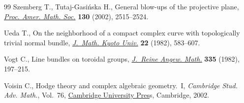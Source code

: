 \documentclass[pdftex]{sigma}
\numberwithin{equation}{section}
\begin{document}
\begin{thebibliography}{99}
Szemberg T., Tutaj-Gasi\'nska H., General blow-ups of the projective plane,
 \href{https://doi.org/10.1090/S0002-9939-02-06488-2}{\textit{Proc. Amer.
 Math. Soc.}} \textbf{130} (2002), 2515--2524.

Ueda T., On the neighborhood of a compact complex curve with topologically
 trivial normal bundle,
 \href{https://doi.org/10.1215/kjm/1250521670}{\textit{J.~Math. Kyoto Univ.}}
 \textbf{22} (1982), 583--607.

Vogt C., Line bundles on toroidal groups,
 \href{https://doi.org/10.1515/crll.1982.335.197}{\textit{J.~Reine Angew.
 Math.}} \textbf{335} (1982), 197--215.

Voisin C., Hodge theory and complex algebraic geometry.~{I}, \textit{Cambridge
 Stud. Adv. Math.}, Vol.~76,
 \href{https://doi.org/10.1017/CBO9780511615344}{Cambridge University Pres}s,
 Cambridge, 2002.

\end{thebibliography}\LastPageEnding
\end{document}
